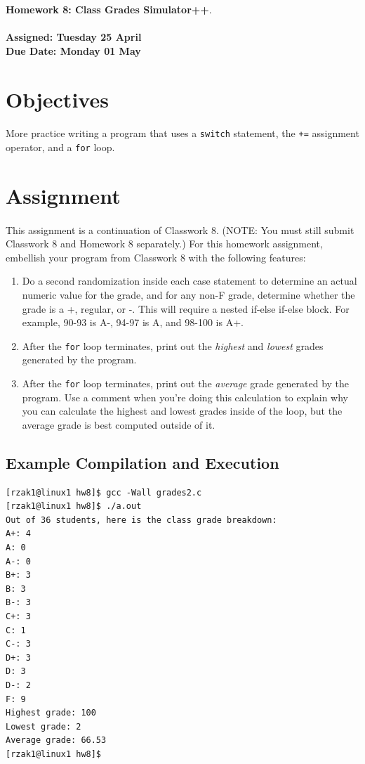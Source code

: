 \documentclass[letter,11pt]{article}
\begin{document}
\huge
\textbf{Homework 8: Class Grades Simulator++}.
\normalsize
\\ ~~ \\
\textbf{Assigned: Tuesday 25 April} \\
\textbf{Due Date: Monday 01 May} %

\section*{Objectives}
\paragraph{}More practice writing a program that uses a \texttt{switch} statement, the \texttt{+=} assignment operator, and a \texttt{for} loop.

\section*{Assignment}
\paragraph{}This assignment is a continuation of Classwork 8. (NOTE: You must still submit Classwork 8 and Homework 8 separately.) For this homework assignment, embellish your program from Classwork 8 with the following features:
\begin{enumerate}
    \item Do a second randomization inside each case statement to determine an actual numeric value for the grade, and for any non-F grade, determine whether the grade is a +, regular, or -. This will require a nested if-else if-else block. For example, 90-93 is A-, 94-97 is A, and 98-100 is A+.
    \item After the \texttt{for} loop terminates, print out the \textit{highest} and \textit{lowest} grades generated by the program.
    \item After the \texttt{for} loop terminates, print out the \textit{average} grade generated by the program. Use a comment when you're doing this calculation to explain why you can calculate the highest and lowest grades inside of the loop, but the average grade is best computed outside of it.
\end{enumerate}

\subsection*{Example Compilation and Execution}
\begin{verbatim}
[rzak1@linux1 hw8]$ gcc -Wall grades2.c
[rzak1@linux1 hw8]$ ./a.out
Out of 36 students, here is the class grade breakdown:
A+: 4
A: 0
A-: 0
B+: 3
B: 3
B-: 3
C+: 3
C: 1
C-: 3
D+: 3
D: 3
D-: 2
F: 9
Highest grade: 100
Lowest grade: 2
Average grade: 66.53
[rzak1@linux1 hw8]$ 
\end{verbatim}
\end{document}
